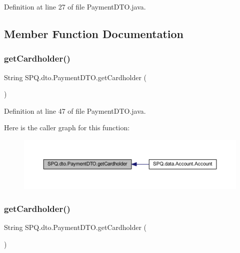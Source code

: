 Definition at line 27 of file Payment\+D\+T\+O.\+java.



\subsection{Member Function Documentation}
\mbox{\label{class_s_p_q_1_1dto_1_1_payment_d_t_o_ac4812465bc4dd874aad6269fe8486e0b}} 
\subsubsection{\texorpdfstring{get\+Cardholder()}{getCardholder()}\hspace{0.1cm}{\footnotesize\ttfamily [1/3]}}
{\footnotesize\ttfamily String S\+P\+Q.\+dto.\+Payment\+D\+T\+O.\+get\+Cardholder (\begin{DoxyParamCaption}{ }\end{DoxyParamCaption})}



Definition at line 47 of file Payment\+D\+T\+O.\+java.

Here is the caller graph for this function\+:
\nopagebreak
\begin{figure}[H]
\begin{center}
\leavevmode
\includegraphics[width=350pt]{class_s_p_q_1_1dto_1_1_payment_d_t_o_ac4812465bc4dd874aad6269fe8486e0b_icgraph}
\end{center}
\end{figure}
\mbox{\label{class_s_p_q_1_1dto_1_1_payment_d_t_o_ac4812465bc4dd874aad6269fe8486e0b}} 
\subsubsection{\texorpdfstring{get\+Cardholder()}{getCardholder()}\hspace{0.1cm}{\footnotesize\ttfamily [2/3]}}
{\footnotesize\ttfamily String S\+P\+Q.\+dto.\+Payment\+D\+T\+O.\+get\+Cardholder (\begin{DoxyParamCaption}{ }\end{DoxyParamCaption})}



